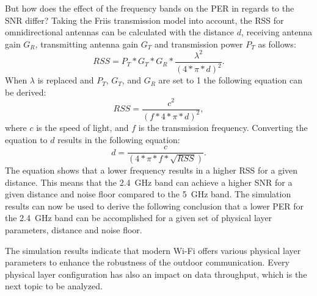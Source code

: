 But how does the effect of the frequency bands on the \ac{PER} in regards to the \ac{SNR} differ?
Taking the Friis transmission model \cite{shaw_radiometry_2013} into account, the \ac{RSS} for omnidirectional antennas can be calculated with the distance $d$,
receiving antenna gain $G_{R}$, transmitting antenna gain $G_{T}$ and transmission power $P_{T}$  as follows:
\begin{equation}
   RSS = P_{T} * G_{T} * G_{R} * \frac{\lambda^2}{(4 * \pi * d)^2}.
\end{equation}
When $\lambda$ is replaced and  $P_{T}$,  $G_{T}$,  and $G_{R}$ are set to \num{1} the following equation can be derived:
\begin{equation}
   RSS = \frac{c^2}{(f* 4 * \pi * d)^2},
\end{equation}
where $c$ is the speed of light, and $f$ is the transmission frequency.
Converting the equation to $d$ results in the following equation:
\begin{equation}
   d = \frac{c}{(4 * \pi * f * \sqrt {RSS})}.
\end{equation}
The equation shows that a lower frequency results in a higher \ac{RSS} for a given distance.
This means that the \SI{2.4}{\giga\hertz} band can achieve a higher \ac{SNR} for a given distance and noise floor
compared to the \SI{5}{\giga\hertz} band.
The simulation results can now be used to derive the following conclusion
that a lower \ac{PER} for the \SI{2.4}{\giga\hertz} band can be accomplished
for a given set of physical layer parameters, distance and noise floor.

The simulation results indicate that modern Wi-Fi offers various physical layer parameters to enhance the robustness of the outdoor communication.
Every physical layer configuration has also an impact on data throughput, which is the next topic to be analyzed.
